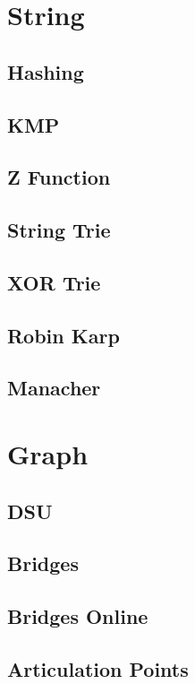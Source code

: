 \documentclass[a4paper, twocolumn]{article}
\begin{document}
\section{String}
\subsection{Hashing}

\subsection{KMP}

\subsection{Z Function}

\subsection{String Trie}

\subsection{XOR Trie}

\subsection{Robin Karp}

\subsection{Manacher}


\section{Graph}
\subsection{DSU}

\subsection{Bridges}

\subsection{Bridges Online}

\subsection{Articulation Points}

\end{document}
